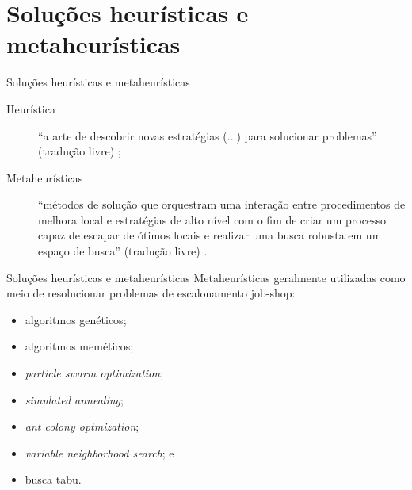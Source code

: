 \documentclass{beamer}
\begin{document}
\section{Solu\c{c}\~{o}es heur\'{i}sticas e metaheur\'{i}sticas}
\begin{frame}{Solu\c{c}\~{o}es heur\'{i}sticas e metaheur\'{i}sticas}
\begin{description}
\item[Heurística] ``a arte de descobrir novas estrat\'{e}gias (...) para solucionar problemas'' (tradu\c{c}\~{a}o livre) \cite{Talbi2009};
\item[Metaheur\'{i}sticas] ``m\'{e}todos de solu\c{c}\~{a}o que orquestram uma intera\c{c}\~{a}o entre procedimentos de melhora local
e estrat\'{e}gias de alto n\'{i}vel com o fim de criar um processo capaz de escapar de \'{o}timos locais e realizar uma busca robusta
em um espa\c{c}o de busca'' (tradu\c{c}\~{a}o livre) \cite{Gendreau2010}.
\end{description}
\end{frame}
\begin{frame}{Solu\c{c}\~{o}es heur\'{i}sticas e metaheur\'{i}sticas}
Metaheurísticas geralmente utilizadas como meio de resolucionar problemas de escalonamento job-shop:
\begin{itemize}
\item<1-> algoritmos genéticos;
\item<2-> algoritmos meméticos;
\item<3-> \textit{particle swarm optimization};
\item<4-> \textit{simulated annealing};
\item<5-> \textit{ant colony optmization};
\item<6-> \textit{variable neighborhood search}; e
\item<7-> busca tabu.
\end{itemize}
\end{frame}
\end{document}
